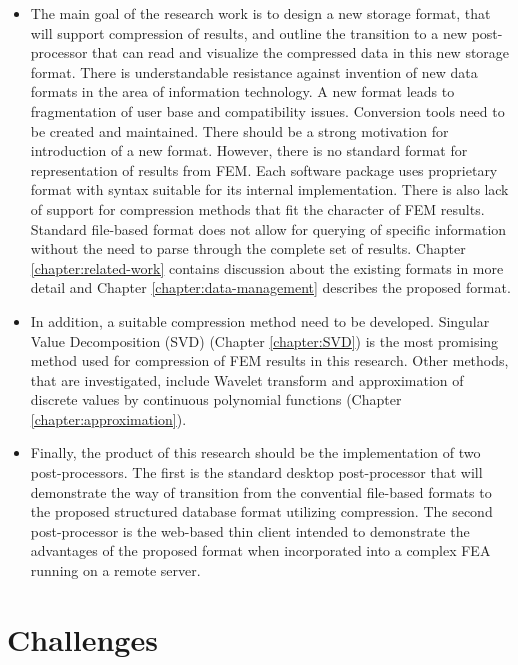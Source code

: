 \begin{itemize}
    \item The main goal of the research work is to design a new storage format, that will support compression of results, and outline the transition to a new post-processor that can read and visualize the compressed data in this new storage format. There is understandable resistance against invention of new data formats in the area of information technology. A new format leads to fragmentation of user base and compatibility issues. Conversion tools need to be created and maintained. There should be a strong motivation for introduction of a new format. However, there is no standard format for representation of results from FEM. Each software package uses proprietary format with syntax suitable for its internal implementation. There is also lack of support for compression methods that fit the character of FEM results. Standard file-based format does not allow for querying of specific information without the need to parse through the complete set of results. Chapter \ref{chapter:related-work} contains discussion about the existing formats in more detail and Chapter \ref{chapter:data-management} describes the proposed format.
    \item In addition, a suitable compression method need to be developed. Singular Value Decomposition (SVD) (Chapter \ref{chapter:SVD}) is the most promising method used for compression of FEM results in this research. Other methods, that are investigated, include Wavelet transform \cite{Li2014} and approximation of discrete values by continuous polynomial functions (Chapter \ref{chapter:approximation}).
    \item Finally, the product of this research should be the implementation of two post-processors. The first is the standard desktop post-processor that will demonstrate the way of transition from the convential file-based formats to the proposed structured database format utilizing compression. The second post-processor is the web-based thin client intended to demonstrate the advantages of the proposed format when incorporated into a complex FEA running on a remote server.
\end{itemize}


\section{Challenges}

